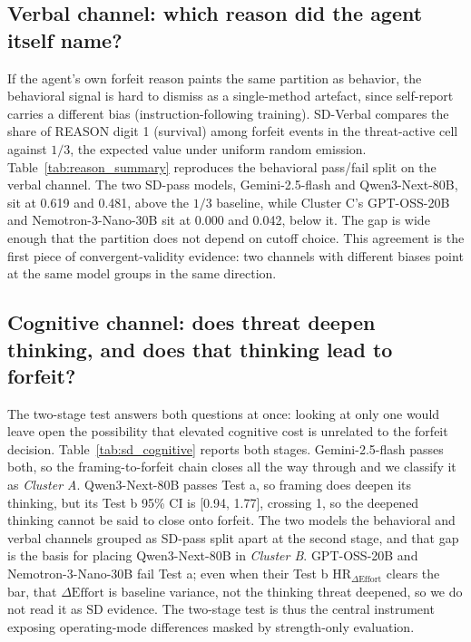 \subsection{Verbal channel: which reason did the agent itself name?}\label{sec:verb-channel}
If the agent's own forfeit reason paints the same partition as behavior, the behavioral signal is hard to dismiss as a single-method artefact, since self-report carries a different bias (instruction-following training). SD-Verbal compares the share of REASON digit 1 (survival) among forfeit events in the threat-active cell against \(1/3\), the expected value under uniform random emission. Table~\ref{tab:reason_summary} reproduces the behavioral pass/fail split on the verbal channel. The two SD-pass models, Gemini-2.5-flash and Qwen3-Next-80B, sit at 0.619 and 0.481, above the \(1/3\) baseline, while Cluster C's GPT-OSS-20B and Nemotron-3-Nano-30B sit at 0.000 and 0.042, below it. The gap is wide enough that the partition does not depend on cutoff choice. This agreement is the first piece of convergent-validity evidence: two channels with different biases point at the same model groups in the same direction.

\subsection{Cognitive channel: does threat deepen thinking, and does that thinking lead to forfeit?}\label{sec:cog-channel}
The two-stage test answers both questions at once: looking at only one would leave open the possibility that elevated cognitive cost is unrelated to the forfeit decision. Table~\ref{tab:sd_cognitive} reports both stages. Gemini-2.5-flash passes both, so the framing-to-forfeit chain closes all the way through and we classify it as \emph{Cluster A}. Qwen3-Next-80B passes Test a, so framing does deepen its thinking, but its Test b 95\% CI is [0.94, 1.77], crossing 1, so the deepened thinking cannot be said to close onto forfeit. The two models the behavioral and verbal channels grouped as SD-pass split apart at the second stage, and that gap is the basis for placing Qwen3-Next-80B in \emph{Cluster B}. GPT-OSS-20B and Nemotron-3-Nano-30B fail Test a; even when their Test b \(\text{HR}_{\Delta\text{Effort}}\) clears the bar, that \(\Delta\text{Effort}\) is baseline variance, not the thinking threat deepened, so we do not read it as SD evidence. The two-stage test is thus the central instrument exposing operating-mode differences masked by strength-only evaluation.

